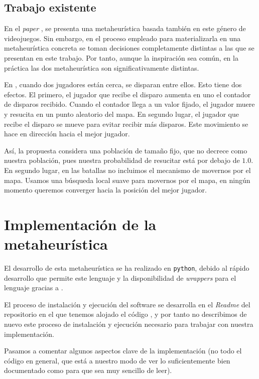 \documentclass[11pt]{article}
\begin{document}
\subsection{Trabajo existente}

En el \emph{paper} \cite{other_paper:paper}, se presenta una metaheurística basada también en este género de videojuegos. Sin embargo, en el proceso empleado para materializarla en una metaheurística concreta se toman decisiones completamente distintas a las que se presentan en este trabajo. Por tanto, aunque la inspiración sea común, en la práctica las dos metaheurística son significativamente distintas.

En \cite{other_paper:paper}, cuando dos jugadores están cerca, se disparan entre ellos. Esto tiene dos efectos. El primero, el jugador que recibe el disparo aumenta en uno el contador de disparos recibido. Cuando el contador llega a un valor fijado, el jugador muere y resucita en un punto aleatorio del mapa. En segundo lugar, el jugador que recibe el disparo se mueve para evitar recibir más disparos. Este movimiento se hace en dirección hacia el mejor jugador.

Así, la propuesta \cite{other_paper:paper} considera una población de tamaño fijo, que no decrece como nuestra población, pues nuestra probabilidad de resucitar está por debajo de $1.0$. En segundo lugar, en las batallas no incluimos el mecanismo de movernos por el mapa. Usamos una búsqueda local suave para movernos por el mapa, en ningún momento queremos converger hacia la posición del mejor jugador.

\pagebreak
\section{Implementación de la metaheurística} \label{implementacion}

El desarrollo de esta metaheurística se ha realizado en \lstinline{python}, debido al rápido desarrollo que permite este lenguaje y la disponibilidad de \emph{wrappers} para el lenguaje gracias a \cite{daniel_repo:online}.

El proceso de instalación y ejecución del software se desarrolla en el \emph{Readme} del repositorio en el que tenemos alojado el código \cite{repositorio:online}, y por tanto no describimos de nuevo este proceso de instalación y ejecución necesario para trabajar con nuestra implementación.

Pasamos a comentar algunos aspectos clave de la implementación (no todo el código en general, que está a nuestro modo de ver lo suficientemente bien documentado como para que sea muy sencillo de leer).
\end{document}
